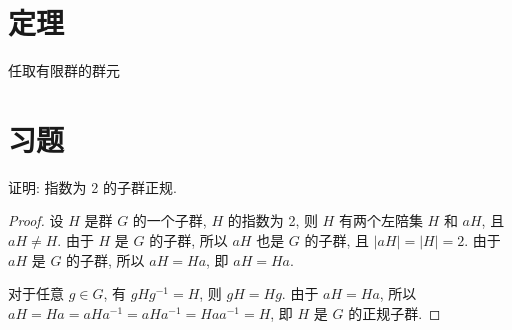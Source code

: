 
    \section{定理}
        \begin{theorem}
            任取有限群的群元
        \end{theorem}

    \section{习题}  

        \begin{example}
            证明: 指数为 2 的子群正规.
        \end{example}

        \begin{proof}
            设 $H$ 是群 $G$ 的一个子群, $H$ 的指数为 2, 则 $H$ 有两个左陪集 $H$ 和 $aH$, 且 $aH \neq H$. 由于 $H$ 是 $G$ 的子群, 所以 $aH$ 也是 $G$ 的子群, 且 $|aH| = |H| = 2$. 由于 $aH$ 是 $G$ 的子群, 所以 $aH = Ha$, 即 $aH = Ha$.

            对于任意 $g \in G$, 有 $gHg^{-1} = H$, 则 $gH = Hg$. 由于 $aH = Ha$, 所以 $aH = Ha = aHa^{-1} = aHa^{-1} = Haa^{-1} = H$, 即 $H$ 是 $G$ 的正规子群.
        \end{proof}
